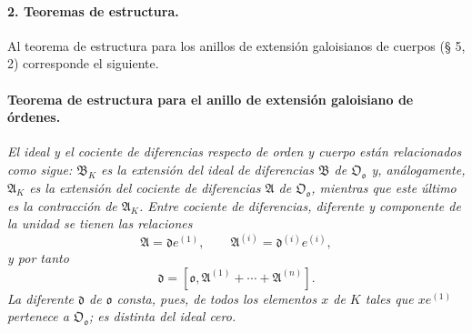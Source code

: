 \paragraph{2. Teoremas de estructura.}
Al teorema de estructura para los anillos de extensión galoisianos de cuerpos (§ 5, 2) corresponde el siguiente.

\paragraph{Teorema de estructura para el anillo de extensión galoisiano de órdenes.}
\emph{El ideal y el cociente de diferencias respecto de orden y cuerpo están relacionados como sigue: $\mathfrak B_K$ es la extensión del ideal de diferencias $\mathfrak B$ de $\mathfrak O_{\mathfrak o}$ y, análogamente, $\mathfrak A_K$ es la extensión del cociente de diferencias $\mathfrak A$ de $\mathfrak O_{\mathfrak o}$, mientras que este último es la contracción de $\mathfrak A_K$. Entre cociente de diferencias, diferente y componente de la unidad se tienen las relaciones}
\[
\mathfrak A=\mathfrak d e^{(1)},
\qquad
\mathfrak A^{(i)}=\mathfrak d^{(i)}e^{(i)},
\]
\emph{y por tanto}
\[
\mathfrak d=[\mathfrak o,\mathfrak A^{(1)}+\cdots+\mathfrak A^{(n)}].
\]
\emph{La diferente $\mathfrak d$ de $\mathfrak o$ consta, pues, de todos los elementos $x$ de $K$ tales que $xe^{(1)}$ pertenece a $\mathfrak O_{\mathfrak o}$; es distinta del ideal cero.}

